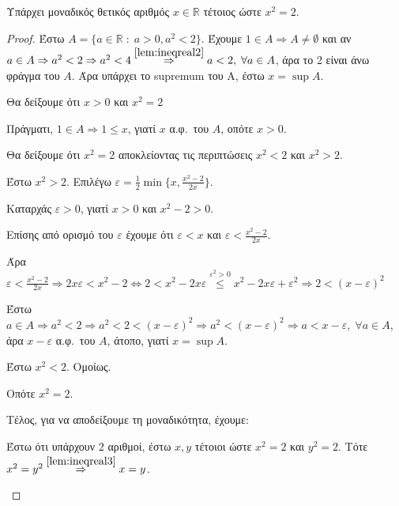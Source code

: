 \documentclass[main.tex]{subfiles}
\begin{document}
\begin{mythmbox}
Υπάρχει μοναδικός θετικός αριθμός $ x \in \mathbb{R} $ τέτοιος ώστε $ x^{2}=2 $.
\end{mythmbox}
\begin{proof}
\item {}
  Έστω $ A = \{ a \in \mathbb{R} \; : \; a > 0, a^{2} < 2 \}  $. Έχουμε $ 1 \in A 
  \Rightarrow A \neq \emptyset $ 
  και αν $ a \in A \Rightarrow a^{2} < 2 \Rightarrow a^{2} < 4
  \overset{\ref{lem:ineqreal2}}{\Rightarrow} a <2,\; \forall a \in A $, 
  άρα το 2 είναι άνω φράγμα του $A$. Άρα υπάρχει το supremum του Α, έστω 
  $ x = \sup A $. 

  Θα δείξουμε ότι $ x > 0 $ και $ x^{2} = 2 $

  Πράγματι, $ 1 \in A \Rightarrow 1 \leq x $, γιατί $x$ α.φ.\ του $A$, οπότε $ x >0 $.

  Θα δείξουμε ότι $ x^{2} = 2 $ αποκλείοντας τις περιπτώσεις $ x^{2} <2 $ και 
  $ x^{2} > 2 $.
  \begin{myitemize}
    \item Έστω $ x^{2} > 2 $. Επιλέγω $ \varepsilon = \frac{1}{2} \min \{ x, 
      \frac{x^{2}-2}{2x}\} $.

      Καταρχάς $ \varepsilon > 0 $, γιατί $ x>0 $ και $ x^{2} -2 >0 $. 

      Επίσης από ορισμό του $ \varepsilon $ έχουμε ότι  $\varepsilon < x $ και 
      $ \varepsilon < \frac{x^{2}-2}{2x}$. 

      Άρα $ \varepsilon < \frac{x^{2}-2}{2x} \Rightarrow 
      2x \varepsilon < x^{2} - 2 \Leftrightarrow 2 < x^{2} -2x \varepsilon 
      \overset{\varepsilon ^{2}>0}{\leq}
      x^{2} -2x \varepsilon + \varepsilon ^{2} \Rightarrow 2 
      < (x- \varepsilon )^{2}   $

      Έστω $ a \in A \Rightarrow a^{2} <2 \Rightarrow a^{2}<2< 
      (x- \varepsilon )^{2} \Rightarrow a^{2}< (x- \varepsilon )^{2} 
      \Rightarrow a < x- \varepsilon, \; \forall a \in A$, 
      άρα $ x - \varepsilon $ α.φ.\ του $A$, άτοπο, γιατί $ x= \sup A $.

    \item Έστω $ x^{2}<2 $. Ομοίως.

      Οπότε $ x^{2}=2 $. 

      Τέλος, για να αποδείξουμε τη μοναδικότητα, έχουμε:

      Έστω ότι υπάρχουν $ 2 $ αριθμοί, έστω $ x,y $ τέτοιοι ώστε $ x^{2} =2 $ 
      και $ y^{2}=2 $. Τότε $ x^{2}=y^{2} \overset{\ref{lem:ineqreal3}}
      {\Rightarrow} x =y $.
  \end{myitemize}
\end{proof}
\end{document}
